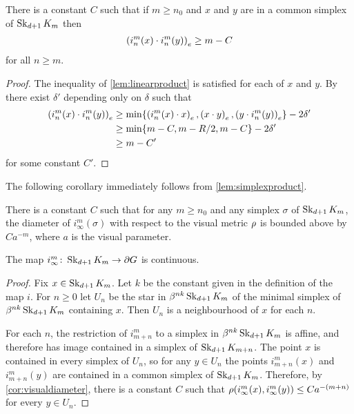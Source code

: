 \documentclass[a4paper]{article}
\begin{document}
\begin{lemma}\label{lem:simplexproduct}
  There is a constant $C$ such that if $m \geq n_0$ and $x$ and $y$ are in a
  common simplex of $\Skel_{d+1} K_m$ then
  \begin{align*}
    \gromov{e}{i^m_n(x)}{i^m_n(y)} \geq m - C
  \end{align*}
  for all $n\geq m$.
\end{lemma}

\begin{proof}
  The inequality of \cref{lem:linearproduct} is satisfied for each of $x$ 
  and $y$. By~\cite{bridsonhaefliger99} there exist $\delta'$ depending only on 
  $\delta$ such that
  \begin{align*}
    \gromov{e}{i^m_n(x)}{i^m_n(y)} &\geq \min\{\gromov{e}{i^m_n(x)}{x}, 
    \gromov{e}{x}{y}, \gromov{e}{y}{i^m_n(y)}\} - 2\delta'\\
    &\geq \min\{m - C, m - R/2, m - C\} - 2\delta' \\
    &\geq m - C'
  \end{align*}
  for some constant $C'$.
\end{proof}

The following corollary immediately follows from \cref{lem:simplexproduct}.

\begin{corollary}\label{cor:visualdiameter}
  There is a constant $C$ such that for any $m\geq n_0$ and any simplex
  $\sigma$ of $\Skel_{d+1} K_m$, the diameter of $i^m_{\infty}(\sigma)$ with
  respect to the visual metric $\vdistance$ is bounded above by $Ca^{-m}$,
  where $a$ is the visual parameter.
\end{corollary}

\begin{proposition}\label{prop:continuouslimit}
  The map $i^m_\infty\from \Skel_{d+1} K_m \to \boundary G$ is continuous.
\end{proposition}

\begin{proof}
  Fix $x \in \Skel_{d+1} K_m$. Let $k$ be the constant given in the definition 
  of the map $i$. For $n\geq 0$ let $U_n$ be the star in $\beta^{nk} 
  \Skel_{d+1}K_m$ of the minimal simplex of $\beta^{nk}\Skel_{d+1}K_m$ 
  containing $x$. Then $U_n$ is a neighbourhood of $x$ for each $n$. 

  For each $n$, the restriction of $i^m_{m+n}$ to a simplex in 
  $\beta^{nk}\Skel_{d+1}K_m$ is affine, and therefore has image contained in a 
  simplex of $\Skel_{d+1} K_{m+n}$. The point $x$ is contained in every simplex 
  of $U_n$, so for any $y \in U_n$ the points $i^m_{m+n}(x)$ and $i^m_{m+n}(y)$ 
  are contained in a common simplex of $\Skel_{d+1}K_m$. Therefore, by 
  \cref{cor:visualdiameter}, there is a constant $C$ such that 
  $\vdistance(i^m_\infty(x), i^m_\infty(y)) \leq Ca^{-(m+n)}$ for every $y \in 
  U_n$.
\end{proof}
\end{document}

